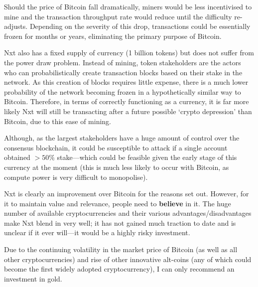 \documentclass[11pt]{article}
\begin{document}
Should the price of Bitcoin fall dramatically, miners would be less incentivised to mine and the transaction throughput rate would reduce until the difficulty re-adjusts. Depending on the severity of this drop, transactions could be essentially frozen for months or years, eliminating the primary purpose of Bitcoin.

Nxt also has a fixed supply of currency (1 billion tokens) but does not suffer from the power draw problem.
Instead of mining, token stakeholders are the actors who can probabilistically create transaction blocks based on their stake in the network.
As this creation of blocks requires little expense, there is a much lower probability of the network becoming frozen in a hypothetically similar way to Bitcoin. 
Therefore, in terms of correctly functioning as a currency, it is far more likely Nxt will still be transacting after a future possible `crypto depression' than Bitcoin, due to this ease of mining. 

Although, as the largest stakeholders have a huge amount of control over the consensus blockchain, it could be susceptible to attack if a single account obtained $>50\%$ stake---which could be feasible given the early stage of this currency at the moment (this is much less likely to occur with Bitcoin, as compute power is very difficult to monopolise).

Nxt is clearly an improvement over Bitcoin for the reasons set out. However, for it to maintain value and relevance, people need to \textbf{believe} in it. The huge number of available cryptocurrencies and their various advantages/disadvantages make Nxt blend in very well; it has not gained much traction to date and is unclear if it ever will---it would be a highly risky investment.

Due to the continuing volatility in the market price of Bitcoin (as well as all other cryptocurrencies) and rise of other innovative alt-coins (any of which could become the first widely adopted cryptocurrency), I can only recommend an investment in gold. 
\end{document}
